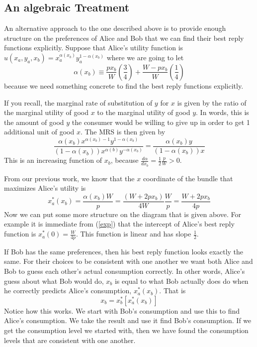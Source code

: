 \documentclass[12pt]{article}
\begin{document}
\subsection{An algebraic Treatment}

An alternative approach to the one described above is to provide enough
structure on the preferences of Alice and Bob that we can find their best
reply functions explicitly. Suppose that Alice's utility function is $u ( x_a,
y_a, x_b ) = x_a^{\alpha ( x_b )} y_a^{1 - \alpha ( x_b )}$ where we are going
to let
\begin{equation}
  \text{$\alpha ( x_b ) \equiv \frac{p x_b}{W} \left( \frac{3}{4} \right) +
  \frac{W - p x_b}{W} \left( \frac{1}{4} \right)$}
\end{equation}
because we need something concrete to find the best reply functions
explicitly.

If you recall, the marginal rate of substitution of $y$ for $x$ is given by
the ratio of the marginal utility of good $x$ to the marginal utility of good
$y$. In words, this is the amount of good $y$ the consumer would be willing to
give up in order to get 1 additional unit of good $x$. The MRS is then given
by
\[ \frac{\alpha ( x_b ) x^{\alpha ( x_b ) - 1} y^{1 - \alpha ( x_b )}}{( 1 -
   \alpha ( x_b ) ) x^{\alpha ( b )} y^{- \alpha ( x_b )}} = \frac{\alpha (
   x_b ) y}{( 1 - \alpha ( x_b ) ) x} \]
This is an increasing function of $x_b$, because $\frac{d \alpha}{d x_b} =
\frac{1}{2} \frac{p}{W} > 0$.

From our previous work, we know that the $x$ coordinate of the bundle that
maximizes Alice's utility is
\begin{equation}
  x^{\ast}_a ( x_b ) = \frac{\alpha ( x_b ) W}{p} = \frac{( W + 2 p x_b )}{4
  W} \frac{W}{p} = \frac{W + 2 p x_b}{4 p} \label{exp}
\end{equation}
Now we can put some more structure on the diagram that is given above. For
example it is immediate from (\ref{exp}) that the intercept of Alice's best
reply function is $x^{\ast}_a ( 0 ) = \frac{W}{4 p}$. This function is linear
and has slope $\frac{1}{2}$.

If Bob has the same preferences, then his best reply function looks exactly
the same. For their choices to be consistent with one another we want both
Alice and Bob to guess each other's actual consumption correctly. In other
words, Alice's guess about what Bob would do, $x_b$ is equal to what Bob
actually does do when he correctly predicts Alice's consumption, $x^{\ast}_a (
x_b )$. That is
\[ x_b = x^{\ast}_b \left[ x^{\ast}_a ( x_b ) \right] \]
Notice how this works. We start with Bob's consumption and use this to find
Alice's consumption. We take the result and use it find Bob's consumption. If
we get the consumption level we started with, then we have found the
consumption levels that are consistent with one another.
\end{document}
